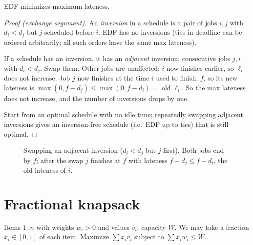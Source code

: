 \begin{theorem}
EDF minimizes maximum lateness.
\end{theorem}
\begin{proof}[Proof (exchange argument)]
An \emph{inversion} in a schedule is a pair of jobs $i,j$ with $d_i<d_j$ but $j$ scheduled before $i$.
EDF has no inversions (ties in deadline can be ordered arbitrarily; all such orders have the same max lateness).

If a schedule has an inversion, it has an \emph{adjacent} inversion: consecutive jobs $j,i$ with $d_i<d_j$.
Swap them. Other jobs are unaffected; $i$ now finishes earlier, so $\ell_i$ does not increase.
Job $j$ now finishes at the time $i$ used to finish, $f$, so its new lateness is
$\max(0,f-d_j)\le\max(0,f-d_i)=$ old $\ell_i$. So the max lateness does not increase, and the number of inversions drops by one.

Start from an optimal schedule with no idle time; repeatedly swapping adjacent inversions gives an inversion-free schedule
(i.e.\ EDF up to ties) that is still optimal.
\end{proof}

\begin{figure}[H]
\centering
{}
\caption{Swapping an adjacent inversion ($d_i<d_j$ but $j$ first). Both
jobs end by $f$; after the swap $j$ finishes at $f$ with lateness
$f-d_j\le f-d_i$, the old lateness of $i$.}
\end{figure}

\section{Fractional knapsack}
Items $1..n$ with weights $w_i>0$ and values $v_i$; capacity $W$. We may take a fraction $x_i\in[0,1]$ of each item.
Maximize $\sum x_iv_i$ subject to $\sum x_iw_i\le W$.

